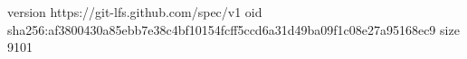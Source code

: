 version https://git-lfs.github.com/spec/v1
oid sha256:af3800430a85ebb7e38c4bf10154fcff5ccd6a31d49ba09f1c08e27a95168ec9
size 9101
